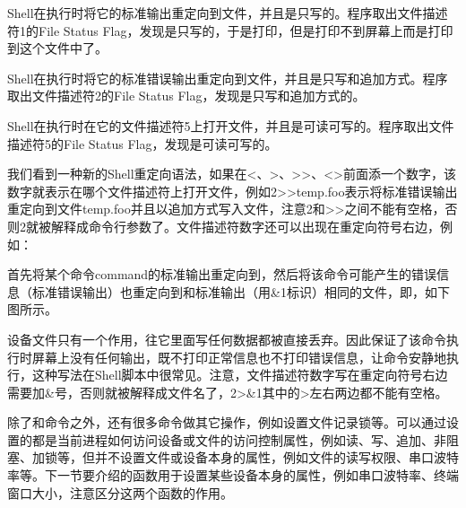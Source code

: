 

Shell在执行时将它的标准输出重定向到文件，并且是只写的。程序取出文件描述符1的File Status Flag，发现是只写的，于是打印，但是打印不到屏幕上而是打印到这个文件中了。




Shell在执行时将它的标准错误输出重定向到文件，并且是只写和追加方式。程序取出文件描述符2的File Status Flag，发现是只写和追加方式的。




Shell在执行时在它的文件描述符5上打开文件，并且是可读可写的。程序取出文件描述符5的File Status Flag，发现是可读可写的。



我们看到一种新的Shell重定向语法，如果在\textless{}、\textgreater{}、\textgreater{}\textgreater{}、\textless{}\textgreater{}前面添一个数字，该数字就表示在哪个文件描述符上打开文件，例如2\textgreater{}\textgreater{}temp.\BookSplit{}foo表示将标准错误输出重定向到文件temp.\BookSplit{}foo并且以追加方式写入文件，注意2和\textgreater{}\textgreater{}之间不能有空格，否则2就被解释成命令行参数了。文件描述符数字还可以出现在重定向符号右边，例如：




首先将某个命令command的标准输出重定向到，然后将该命令可能产生的错误信息（标准错误输出）也重定向到和标准输出（用\&1标识）相同的文件，即，如下图所示。




设备文件只有一个作用，往它里面写任何数据都被直接丢弃。因此保证了该命令执行时屏幕上没有任何输出，既不打印正常信息也不打印错误信息，让命令安静地执行，这种写法在Shell脚本中很常见。注意，文件描述符数字写在重定向符号右边需要加\&号，否则就被解释成文件名了，2\textgreater{}\&1其中的\textgreater{}左右两边都不能有空格。



除了和命令之外，还有很多命令做其它操作，例如设置文件记录锁等。可以通过设置的都是当前进程如何访问设备或文件的访问控制属性，例如读、写、追加、非阻塞、加锁等，但并不设置文件或设备本身的属性，例如文件的读写权限、串口波特率等。下一节要介绍的函数用于设置某些设备本身的属性，例如串口波特率、终端窗口大小，注意区分这两个函数的作用。

